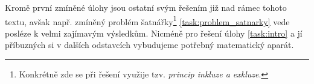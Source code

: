 Kromě první zmíněné úlohy jsou ostatní svým řešením již nad rámec tohoto textu, avšak např. zmíněný problém šatnářky\footnote{Konkrétně zde se při řešení využije tzv. \emph{princip inkluze a exkluze}.} \ref{task:problem_satnarky} vede posléze k velmi zajímavým výsledkům. Nicméně pro řešení úlohy \ref{task:intro} a jí příbuzných si v dalších odstavcích vybudujeme potřebný matematický aparát.\par